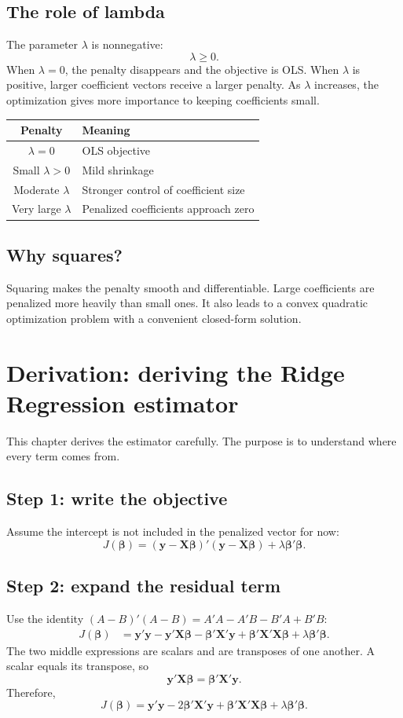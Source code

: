 \documentclass[11pt,a4paper,oneside]{book}
\theoremstyle{remark}
\newcommand{\X}{\mathbf X}
\newcommand{\y}{\mathbf y}
\newcommand{\bta}{\boldsymbol{\beta}}
\begin{document}
\section{The role of lambda}
The parameter $\lambda$ is nonnegative:
\[
\lambda\geq 0.
\]
When $\lambda=0$, the penalty disappears and the objective is OLS.
When $\lambda$ is positive, larger coefficient vectors receive a larger
penalty. As $\lambda$ increases, the optimization gives more importance
to keeping coefficients small.

\begin{center}
\begin{tabular}{@{}cl@{}}
\toprule
Penalty & Meaning\\
\midrule
$\lambda=0$ & OLS objective\\
Small $\lambda>0$ & Mild shrinkage\\
Moderate $\lambda$ & Stronger control of coefficient size\\
Very large $\lambda$ & Penalized coefficients approach zero\\
\bottomrule
\end{tabular}
\end{center}

\section{Why squares?}
Squaring makes the penalty smooth and differentiable. Large coefficients
are penalized more heavily than small ones. It also leads to a convex
quadratic optimization problem with a convenient closed-form solution.

\chapter{Derivation: deriving the Ridge Regression estimator}

This chapter derives the estimator carefully. The purpose is to understand
where every term comes from.

\section{Step 1: write the objective}
Assume the intercept is not included in the penalized vector for now:
\[
J(\bta)=(\y-\X\bta)'(\y-\X\bta)+\lambda\bta'\bta.
\]

\section{Step 2: expand the residual term}
Use the identity $(A-B)'(A-B)=A'A-A'B-B'A+B'B$:
\[
\begin{aligned}
J(\bta)
&=\y'\y-\y'\X\bta-\bta'\X'\y
+\bta'\X'\X\bta+\lambda\bta'\bta.
\end{aligned}
\]
The two middle expressions are scalars and are transposes of one another.
A scalar equals its transpose, so
\[
\y'\X\bta=\bta'\X'\y.
\]
Therefore,
\[
J(\bta)=\y'\y-2\bta'\X'\y+
\bta'\X'\X\bta+\lambda\bta'\bta.
\]
\end{document}
